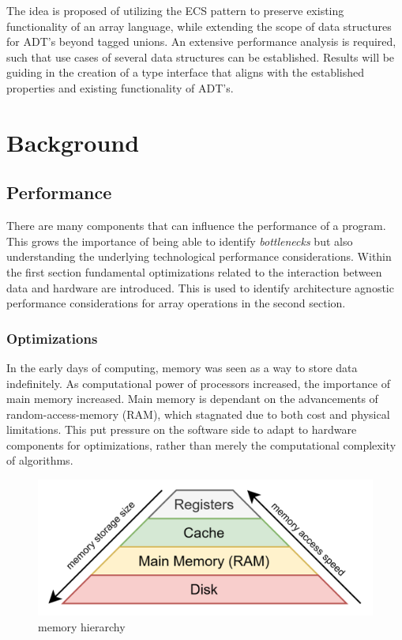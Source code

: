 \documentclass{article}
\begin{document}
The idea is proposed of utilizing the ECS pattern to preserve existing functionality of an array language, while extending the scope of data structures for ADT's beyond tagged unions.
An extensive performance analysis is required, such that use cases of several data structures can be established.
Results will be guiding in the creation of a type interface that aligns with the established properties and existing functionality of ADT's. 

\newpage

\section{Background}

\subsection{Performance}

There are many components that can influence the performance of a program.
This grows the importance of being able to identify {\it bottlenecks} but also understanding the underlying technological performance considerations\cite{programming-optimization}.
Within the first section fundamental optimizations related to the interaction between data and hardware are introduced.
This is used to identify architecture agnostic performance considerations for array operations in the second section.

\subsubsection{Optimizations}

In the early days of computing, memory was seen as a way to store data indefinitely.
As computational power of processors increased, the importance of main memory increased.
Main memory is dependant on the advancements of random-access-memory (RAM), which stagnated due to both cost and physical limitations\cite{memory}. 
This put pressure on the software side to adapt to hardware components for optimizations, rather than merely the computational complexity of algorithms.

\begin{figure}[ht]
    \centering
    \includegraphics[scale=0.2]{memoryhierarchy}
    \caption{ memory hierarchy }
\end{figure}
\end{document}
